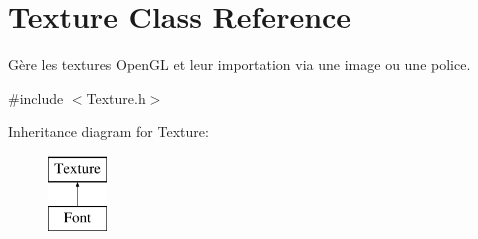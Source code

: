\hypertarget{classTexture}{\section{Texture Class Reference}
\label{classTexture}
}


Gère les textures Open\-G\-L et leur importation via une image ou une police.  




{\ttfamily \#include $<$Texture.\-h$>$}

Inheritance diagram for Texture\-:\begin{figure}[H]
\begin{center}
\leavevmode
\includegraphics[height=2.000000cm]{classTexture}
\end{center}
\end{figure}
